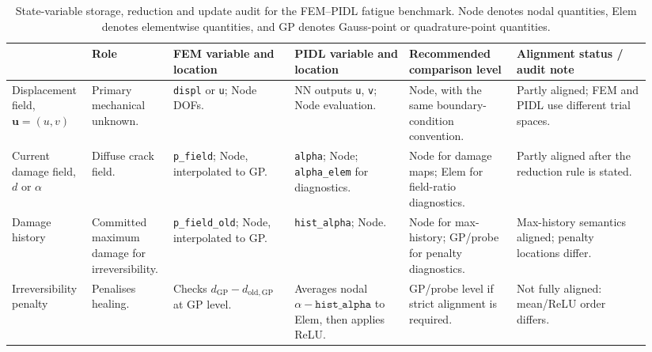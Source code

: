 \begin{landscape}
\begin{table}[p]
\centering
\begingroup
\scriptsize
\setlength{\tabcolsep}{1.6pt}
\renewcommand{\arraystretch}{0.76}
\caption{State-variable storage, reduction and update audit for the FEM--PIDL fatigue benchmark. Node denotes nodal quantities, Elem denotes elementwise quantities, and GP denotes Gauss-point or quadrature-point quantities.}
\label{tab:c3_state_variable_storage_update_audit}
\begin{tabular}{@{}>{\raggedright\arraybackslash}m{0.115\linewidth}
>{\raggedright\arraybackslash}m{0.120\linewidth}
>{\raggedright\arraybackslash}m{0.180\linewidth}
>{\raggedright\arraybackslash}m{0.170\linewidth}
>{\raggedright\arraybackslash}m{0.160\linewidth}
>{\raggedright\arraybackslash}m{0.200\linewidth}@{}}
\hline
{\centering\textbf{Physical quantity}\par}
& {\centering\textbf{Role}\par}
& {\centering\textbf{FEM variable and location}\par}
& {\centering\textbf{PIDL variable and location}\par}
& {\centering\textbf{Recommended comparison level}\par}
& {\centering\textbf{Alignment status / audit note}\par} \\
\hline

Displacement field, \(\mathbf{u}=(u,v)\)
& Primary mechanical unknown.
& \texttt{displ} or \texttt{u}; Node DOFs.
& NN outputs \texttt{u}, \texttt{v}; Node evaluation.
& Node, with the same boundary-condition convention.
& Partly aligned; FEM and PIDL use different trial spaces. \\

Current damage field, \(d\) or \(\alpha\)
& Diffuse crack field.
& \texttt{p\_field}; Node, interpolated to GP.
& \texttt{alpha}; Node; \texttt{alpha\_elem} for diagnostics.
& Node for damage maps; Elem for field-ratio diagnostics.
& Partly aligned after the reduction rule is stated. \\

Damage history
& Committed maximum damage for irreversibility.
& \texttt{p\_field\_old}; Node, interpolated to GP.
& \texttt{hist\_alpha}; Node.
& Node for max-history; GP/probe for penalty diagnostics.
& Max-history semantics aligned; penalty locations differ. \\

Irreversibility penalty
& Penalises healing.
& Checks \(d_{\mathrm{GP}}-d_{\mathrm{old,GP}}\) at GP level.
& Averages nodal \(\alpha-\texttt{hist\_alpha}\) to Elem, then applies ReLU.
& GP/probe level if strict alignment is required.
& Not fully aligned: mean/ReLU order differs. \\


\end{tabular}
\end{table}
\end{landscape}
